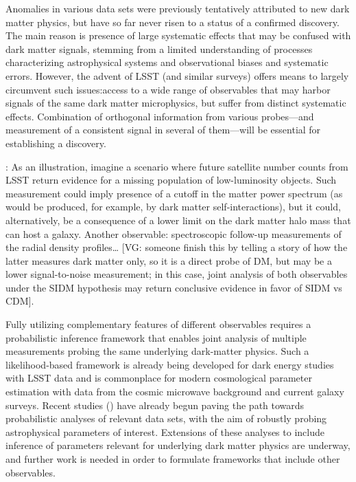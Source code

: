\documentclass[modern,linenumbers]{aastex62}
\begin{document}
Anomalies in various data sets were previously tentatively attributed to new dark matter physics, but have so far never risen to a status of a confirmed discovery. 
The main reason is presence of large systematic effects that may be confused with dark matter signals, stemming from a limited understanding of processes characterizing astrophysical systems and observational biases and systematic errors. 
However, the advent of LSST (and similar surveys) offers means to largely circumvent such issues:access to a wide range of observables that may harbor signals of the same dark matter microphysics, but suffer from distinct systematic effects. 
Combination of orthogonal information from various probes---and measurement of a consistent signal in several of them---will be essential for establishing a discovery. 

: As an illustration, imagine a scenario where future satellite number counts from LSST return evidence for a missing population of low-luminosity objects. 
Such measurement could imply presence of a cutoff in the matter power spectrum (as would be produced, for example, by dark matter self-interactions), but it could, alternatively, be a consequence of a lower limit on the dark matter halo mass that can host a galaxy. 
Another observable: spectroscopic follow-up measurements of the radial density profiles… [VG: someone finish this by telling a story of how the latter measures dark matter only, so it is a direct probe of DM, but may be a lower signal-to-noise measurement; in this case, joint analysis of both observables under the SIDM hypothesis may return conclusive evidence in favor of SIDM vs CDM].

Fully utilizing complementary features of different observables requires a probabilistic inference framework that enables joint analysis of multiple measurements probing the same underlying dark-matter physics. 
Such a likelihood-based framework is already being developed for dark energy studies with LSST data and is commonplace for modern cosmological parameter estimation with data from the cosmic microwave background and current galaxy surveys. 
Recent studies () have already begun paving the path towards probabilistic analyses of relevant data sets, with the aim of robustly probing astrophysical parameters of interest. 
Extensions of these analyses to include inference of parameters relevant for underlying dark matter physics are underway, and further work is needed in order to formulate frameworks that include other observables. 
\end{document}
